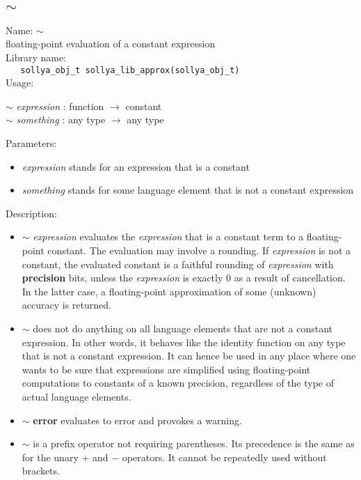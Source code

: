 \subsection{$\sim$}
\label{labapprox}
\noindent Name: \textbf{$\sim$}\\
\phantom{aaa}floating-point evaluation of a constant expression\\[0.2cm]
\noindent Library name:\\
\verb|   sollya_obj_t sollya_lib_approx(sollya_obj_t)|\\[0.2cm]
\noindent Usage: 
\begin{center}
\textbf{$\sim$} \emph{expression} : \textsf{function} $\rightarrow$ \textsf{constant}\\
\textbf{$\sim$} \emph{something} : \textsf{any type} $\rightarrow$ \textsf{any type}\\
\end{center}
Parameters: 
\begin{itemize}
\item \emph{expression} stands for an expression that is a constant
\item \emph{something} stands for some language element that is not a constant expression
\end{itemize}
\noindent Description: \begin{itemize}

\item \textbf{$\sim$} \emph{expression} evaluates the \emph{expression} that is a constant
   term to a floating-point constant. The evaluation may involve a
   rounding. If \emph{expression} is not a constant, the evaluated constant is
   a faithful rounding of \emph{expression} with \textbf{precision} bits, unless the
   \emph{expression} is exactly $0$ as a result of cancellation. In the
   latter case, a floating-point approximation of some (unknown) accuracy
   is returned.

\item \textbf{$\sim$} does not do anything on all language elements that are not a
   constant expression.  In other words, it behaves like the identity
   function on any type that is not a constant expression. It can hence
   be used in any place where one wants to be sure that expressions are
   simplified using floating-point computations to constants of a known
   precision, regardless of the type of actual language elements.

\item \textbf{$\sim$} \textbf{error} evaluates to error and provokes a warning.

\item \textbf{$\sim$} is a prefix operator not requiring parentheses. Its
   precedence is the same as for the unary $+$ and $-$
   operators. It cannot be repeatedly used without brackets.
\end{itemize}
